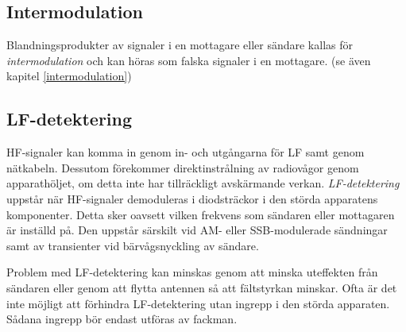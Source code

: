 \subsection{Intermodulation}

Blandningsprodukter av signaler i en mottagare eller sändare kallas för
\emph{intermodulation} och kan höras som falska signaler i en mottagare.
(se även kapitel \ref{intermodulation})

\subsection{LF-detektering}

HF-signaler kan komma in genom in- och utgångarna för LF samt genom nätkabeln.
Dessutom förekommer direktinstrålning av radiovågor genom apparathöljet, om
detta inte har tillräckligt avskärmande verkan.
\emph{LF-detektering} uppstår när HF-signaler demoduleras i diodsträckor i den
störda apparatens komponenter.
Detta sker oavsett vilken frekvens som sändaren eller mottagaren är inställd på.
Den uppstår särskilt vid AM- eller SSB-modulerade sändningar
samt av transienter vid bärvågsnyckling av sändare.

Problem med LF-detektering kan minskas genom att minska uteffekten från sändaren
eller genom att flytta antennen så att fältstyrkan minskar.
Ofta är det inte möjligt att förhindra LF-detektering utan ingrepp i den störda
apparaten.
Sådana ingrepp bör endast utföras av fackman.
